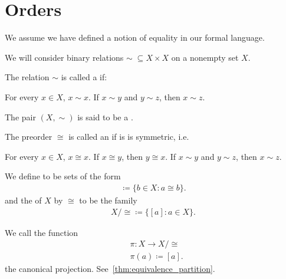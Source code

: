 \section{Orders}\label{sec:orders}

We assume we have defined a notion of equality in our formal language.

\begin{definition}\label{def:order}
  We will consider binary relations \( \sim\; \subseteq X \times X \) on a nonempty set \( X \).

  \begin{defenum}
    \item\label{def:order/preorder}\cite{nLab:preorder} The relation \( \sim \) is called a  if:
    \begin{description}
       For every \( x \in X \), \( x \sim x \).
       If \( x \sim y \) and \( y \sim z \), then \( x \sim z \).
    \end{description}

    The pair \( (X, \sim) \) is said to be a .

    \item\label{def:order/equivalence}\cite[56]{Enderton1977} The preorder \( \cong \) is called an  if is is symmetric, i.e.
    \begin{description}
       For every \( x \in X \), \( x \cong x \).
       If \( x \cong y \), then \( y \cong x \).
       If \( x \sim y \) and \( y \sim z \), then \( x \sim z \).
    \end{description}

    We define  to be sets of the form
    \begin{align*}
      [a] \coloneqq \{ b \in X \colon a \cong b \}.
    \end{align*}
    and the  of \( X \) by \( \cong \) to be the family
    \begin{align*}
      X / \cong \coloneqq \{ [a] \colon a \in X \}.
    \end{align*}

    We call the function
    \begin{align*}
      &\pi: X \to X / \cong \\
      &\pi(a) \coloneqq [a].
    \end{align*}
    the canonical projection. See~\cref{thm:equivalence_partition}.


\end{defenum}
\end{definition}

